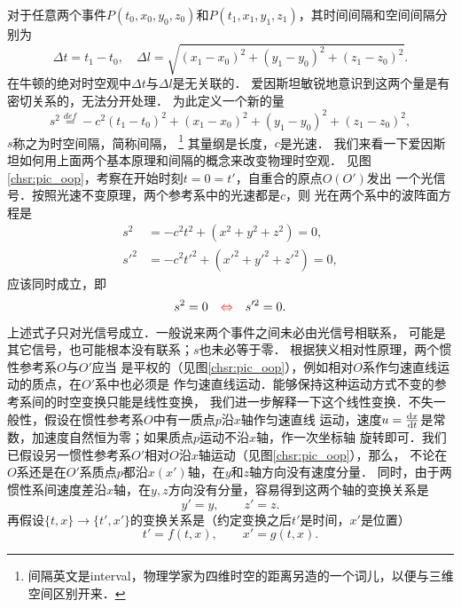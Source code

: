 对于任意两个事件$P(t_0,x_0,y_0,z_0)$和$P(t_1,x_1,y_1,z_1)$，其时间间隔和空间间隔分别为
\begin{equation}
  \Delta t = t_1-t_0, \quad
  \Delta l = \sqrt{(x_1-x_0)^2+(y_1-y_0)^2+(z_1-z_0)^2}.
\end{equation}
在牛顿的绝对时空观中$\Delta t$与$\Delta l$是无关联的．
爱因斯坦敏锐地意识到这两个量是有密切关系的，无法分开处理．
为此定义一个新的量
\begin{equation}\label{chsr:eqn_interval}
  s ^2 \overset{def}{=} -c^2 (t_1-t_0)^2 + (x_1-x_0)^2+(y_1-y_0)^2+(z_1-z_0)^2,
\end{equation}
$s$称之为{\heiti 时空间隔}，简称{\heiti 间隔}，
{\footnote{间隔英文是interval，物理学家为四维时空的距离另造的一个词儿，以便与三维空间区别开来．}}
其量纲是长度，$c$是光速．
我们来看一下爱因斯坦如何用上面两个基本原理和间隔的概念来改变物理时空观．
见图\ref{chsr:pic_oop}，考察在开始时刻$t=0=t'$，自重合的原点$O(O')$发出
一个光信号．{\kaishu 按照光速不变原理}，两个参考系中的光速都是$c$，则
光在两个系中的波阵面方程是
\begin{align}
  s ^2 &= -c^2 t ^2 + ({x^2+ y^2+ z^2})=0, \\
  s'^2 &= -c^2 t'^2 + ({x'^2+ y'^2+ z'^2})=0,
\end{align}
应该同时成立，即
\begin{equation}
  s ^2 =0 {\quad \color{red} \Leftrightarrow \quad } s'^2 =0.
\end{equation}
上述式子只对光信号成立．一般说来两个事件之间未必由光信号相联系，
可能是其它信号，也可能根本没有联系；$s$也未必等于零．
{\kaishu 根据狭义相对性原理}，两个惯性参考系$O$与$O'$应当
是平权的（见图\ref{chsr:pic_oop}），例如相对$O$系作匀速直线运动的质点，在$O'$系中也必须是
作匀速直线运动．能够保持这种运动方式不变的参考系间的时空变换只能是线性变换，
我们进一步解释一下这个线性变换．不失一般性，假设在惯性参考系$O$中有一质点$p$沿$x$轴作匀速直线
运动，速度$u=\frac{{\rm d}x}{{\rm d}t}$是常数，加速度自然恒为零；如果质点$p$运动不沿$x$轴，作一次坐标轴
旋转即可．我们已假设另一惯性参考系$O'$相对$O$沿$x$轴运动（见图\ref{chsr:pic_oop}），那么，
不论在$O$系还是在$O'$系质点$p$都沿$x(x')$轴，在$y$和$z$轴方向没有速度分量．
同时，由于两惯性系间速度差沿$x$轴，在$y,z$方向没有分量，容易得到这两个轴的变换关系是
\begin{equation}
    y' = y, \qquad z'=z.
\end{equation}
再假设$\{t,x\}\to \{t',x'\}$的变换关系是（约定变换之后$t'$是时间，$x'$是位置）
\begin{equation}
    t'= f(t,x), \qquad  x'= g(t,x).
\end{equation}
